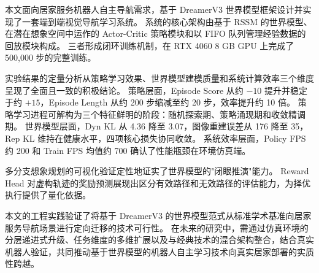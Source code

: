\documentclass[12pt,a4paper]{ctexart}
\begin{document}
本文面向居家服务机器人自主导航需求，基于 DreamerV3 世界模型框架设计并实现了一套端到端视觉导航学习系统。
系统的核心架构由基于 RSSM 的世界模型、在潜在想象空间中运作的 Actor-Critic 策略模块和以 FIFO 队列管理经验数据的回放模块构成。
三者形成闭环训练机制，在 RTX 4060 8 GB GPU 上完成了 500,000 步的完整训练。

实验结果的定量分析从策略学习效果、世界模型建模质量和系统计算效率三个维度呈现了全面且一致的积极结论。
策略层面，Episode Score 从约 $-10$ 提升并稳定于约 $+15$，Episode Length 从约 200 步缩减至约 20 步，效率提升约 10 倍。
策略学习进程可解构为三个特征鲜明的阶段：随机探索期、策略涌现期和收敛精调期。
世界模型层面，Dyn KL 从 4.36 降至 3.07，图像重建误差从 176 降至 35，Rep KL 维持在健康水平，四项核心损失协同收敛。
系统效率层面，Policy FPS 约 200 和 Train FPS 均值约 700 确认了性能瓶颈在环境仿真端。

多分支想象规划的可视化验证定性地证实了世界模型的"闭眼推演"能力。
Reward Head 对虚构轨迹的奖励预测展现出区分有效路径和无效路径的评估能力，为择优执行提供了量化依据。

本文的工程实践验证了将基于 DreamerV3 的世界模型范式从标准学术基准向居家服务导航场景进行定向迁移的技术可行性。
在未来的研究中，需通过仿真环境的分层递进式升级、任务维度的多维扩展以及与经典技术的混合架构整合，结合真实机器人验证，共同推动基于世界模型的机器人自主学习技术向真实居家部署的实质性跨越。

\newpage
\end{document}
